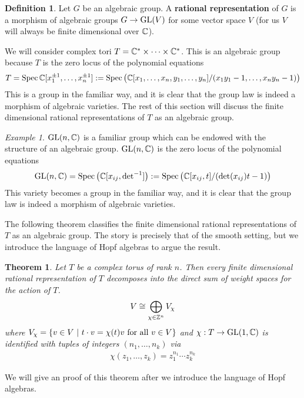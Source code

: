 \documentclass{amsart}
\numberwithin{equation}{section}
\theoremstyle{plain} %
\newtheorem{theorem}[equation]{Theorem}
\theoremstyle{definition}
\newtheorem{definition}[equation]{Definition}
\theoremstyle{remark}
\newtheorem{example}[equation]{Example}
\begin{document}
\begin{definition}
	Let $G$ be an algebraic group. A \textbf{rational representation} of $G$ is a morphism of algebraic groups
	$G\to \operatorname{GL}(V)$ for some vector space $V$ (for us $V$ will always be finite dimensional over $\mathbb{C}$).
\end{definition}

We will consider complex tori $T = \mathbb{C}^* \times \dots \times \mathbb{C}^*$.
This is an algebraic group because $T$ is the zero locus of
the polynomial equations \begin{align*}
	T = \operatorname{Spec} \mathbb{C}[x_1^{\pm 1},\ldots, x_n^{\pm 1}] := \operatorname{Spec}\big(\mathbb{C}[x_1,\dots,x_n,y_1,\dots,y_n]/(x_1y_1-1,\dots,x_ny_n-1)\big)
\end{align*} This is a group in the familiar way,
and it is clear that the group law is indeed a morphism of algebraic varieties. The rest of this section will discuss
the finite dimensional rational representations of $T$ as an algebraic group.

\begin{example}
	$\operatorname{GL}(n,\mathbb{C})$ is a familiar group which can be endowed with the structure of an algebraic group.
	$\operatorname{GL}(n,\mathbb{C})$ is the zero locus of the polynomial equations
	\begin{align*}
		\operatorname{GL}(n,\mathbb{C}) = \operatorname{Spec} \big(\mathbb{C}[x_{ij},{\det}^{-1}]\big) := \operatorname{Spec}\big(\mathbb{C}[x_{ij},t]/(\det(x_{ij})t-1)\big)
	\end{align*} This variety becomes a group in the familiar way,
	and it is clear that the group law is indeed a morphism of algebraic varieties.
\end{example}

The following theorem classifies
the finite dimensional rational representations of $T$ as an algebraic group.
The story is precisely that of the smooth setting, but we introduce the language of Hopf algebras to argue the result.

\begin{theorem}\label{thm:ratrep}
	Let $T$ be a complex torus of rank $n$.
	Then every finite dimensional rational representation of $T$
	decomposes into the direct sum of weight spaces for the action of $T$.
	\begin{align*}
		V \cong \bigoplus_{\chi\in \mathbb{Z}^n} V_\chi
	\end{align*} where $V_\chi = \{v\in V \ \vert \  t\cdot v = \chi(t)v \text{ for all $v\in V$}\}$
	and $\chi:T\to\operatorname{GL}(1,\mathbb{C})$ is identified with tuples of integers $(n_1,\ldots, n_k)$ via \begin{align*}
		\chi(z_1,\ldots, z_k) = z_1^{n_1}\cdots z_k^{n_k}
	\end{align*}
\end{theorem}
We will give an proof of this theorem after we introduce the language of Hopf algebras.
\end{document}
